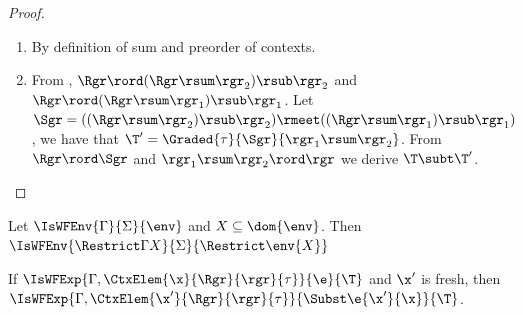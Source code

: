 \begin{proof}
\begin{enumerate}
\item By definition of sum and preorder of contexts. 
\item From ,  $\Rgr\rord(\Rgr\rsum\rgr_2)\rsub\rgr_2$ and $\Rgr\rord(\Rgr\rsum\rgr_1)\rsub\rgr_1$.
Let $\Sgr=((\Rgr\rsum\rgr_2)\rsub\rgr_2)\rmeet((\Rgr\rsum\rgr_1)\rsub\rgr_1)$, we have that 
$\T'= \Graded{\tau}{\Sgr}{\rgr_1\rsum\rgr_2}$. From $\Rgr\rord\Sgr$ and $\rgr_1\rsum\rgr_2\rord\rgr$ we derive $\T\subt\T'$.
\end{enumerate}
\end{proof}



\begin{lemma}\label{lem:restrictEnv}
Let $\IsWFEnv{\Gamma}{\Sigma}{\env}$ and $X\subseteq\dom{\env}$. Then $\IsWFEnv{\Restrict\Gamma{X}}{\Sigma}{\Restrict\env{X}}$
\end{lemma}

\begin{lemma}\label{lem:renaming}
If  $\IsWFExp{\Gamma,\CtxElem{\x}{\Rgr}{\rgr}{\tau}}{\e}{\T}$ and $\x'$ is fresh, then  $\IsWFExp{\Gamma,\CtxElem{\x'}{\Rgr}{\rgr}{\tau}}{\Subst\e{\x'}{\x}}{\T}$.
\end{lemma}


